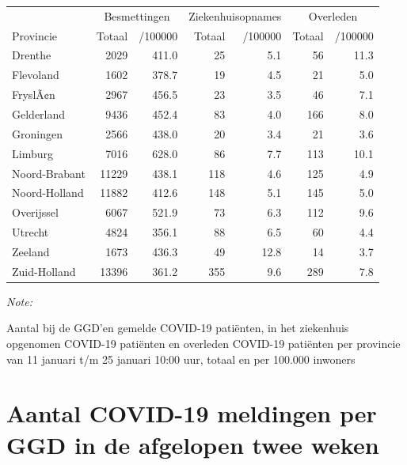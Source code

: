 \documentclass[
  english,
  man,floatsintext]{apa6}
\begin{document}
\begin{table}[H]
\centering
\begin{threeparttable}
\begin{tabular}{lrrrrrr}
\toprule
\multicolumn{1}{c}{ } & \multicolumn{2}{c}{Besmettingen} & \multicolumn{2}{c}{Ziekenhuisopnames} & \multicolumn{2}{c}{Overleden} \\
\cmidrule(l{3pt}r{3pt}){2-3} \cmidrule(l{3pt}r{3pt}){4-5} \cmidrule(l{3pt}r{3pt}){6-7}
Provincie & Totaal & /100000 & Totaal & /100000 & Totaal & /100000\\
\midrule
Drenthe & 2029 & 411.0 & 25 & 5.1 & 56 & 11.3\\
Flevoland & 1602 & 378.7 & 19 & 4.5 & 21 & 5.0\\
FryslÃ¢n & 2967 & 456.5 & 23 & 3.5 & 46 & 7.1\\
Gelderland & 9436 & 452.4 & 83 & 4.0 & 166 & 8.0\\
Groningen & 2566 & 438.0 & 20 & 3.4 & 21 & 3.6\\
Limburg & 7016 & 628.0 & 86 & 7.7 & 113 & 10.1\\
Noord-Brabant & 11229 & 438.1 & 118 & 4.6 & 125 & 4.9\\
Noord-Holland & 11882 & 412.6 & 148 & 5.1 & 145 & 5.0\\
Overijssel & 6067 & 521.9 & 73 & 6.3 & 112 & 9.6\\
Utrecht & 4824 & 356.1 & 88 & 6.5 & 60 & 4.4\\
Zeeland & 1673 & 436.3 & 49 & 12.8 & 14 & 3.7\\
Zuid-Holland & 13396 & 361.2 & 355 & 9.6 & 289 & 7.8\\
\bottomrule
\end{tabular}
\begin{tablenotes}
\item \textit{Note: } 
\item Aantal bij de GGD’en gemelde COVID-19 patiënten, in het ziekenhuis opgenomen COVID-19 patiënten en overleden COVID-19 patiënten per provincie van 11 januari t/m 25 januari 10:00 uur, totaal en per 100.000 inwoners
\end{tablenotes}
\end{threeparttable}
\end{table}

\newpage

\hypertarget{aantal-covid-19-meldingen-per-ggd-in-de-afgelopen-twee-weken}{%
\section{Aantal COVID-19 meldingen per GGD in de afgelopen twee weken}\label{aantal-covid-19-meldingen-per-ggd-in-de-afgelopen-twee-weken}}
\end{document}
